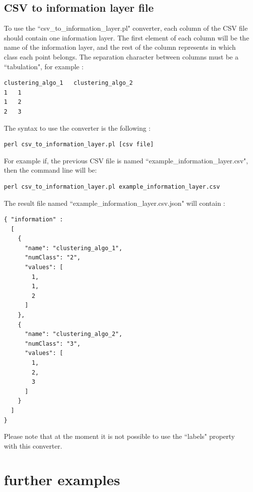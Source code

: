 \documentclass{bioinfo}
\begin{document}
\subsection{CSV to information layer file}
To use the ``csv\_to\_information\_layer.pl" converter, each column of the CSV file should contain one information layer. The first element of each column will be the name of the information layer, and the rest of the column represents in which class each point belongs. The separation character between columns must be a ``tabulation", for example :
\begin{lstlisting}
clustering_algo_1	clustering_algo_2
1	1
1	2
2	3
\end{lstlisting}
The syntax to use the converter is the following :
\begin{lstlisting}
perl csv_to_information_layer.pl [csv file]
\end{lstlisting}
For example if, the previous CSV file is named ``example\_information\_layer.csv", then the command line will be:
\begin{lstlisting}
perl csv_to_information_layer.pl example_information_layer.csv
\end{lstlisting}
The result file named ``example\_information\_layer.csv.json" will contain :
\begin{lstlisting}
{ "information" :
  [
    {
      "name": "clustering_algo_1",
      "numClass": "2",
      "values": [
        1,
        1,
        2
      ]
    },
    {
      "name": "clustering_algo_2",
      "numClass": "3",
      "values": [
        1,
        2,
        3
      ]
    }
  ]
}
\end{lstlisting}
Please note that at the moment it is not possible to use the ``labels" property with this converter. 
\section{further examples}
\end{document}
